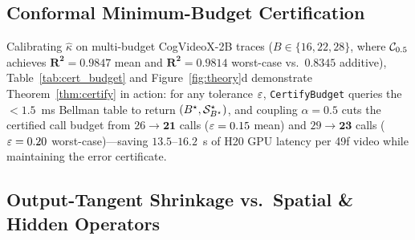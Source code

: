\subsection{Conformal Minimum-Budget Certification}
\label{sec:exp_certify}

\begin{table}[t]
\centering\footnotesize\setlength{\tabcolsep}{3.3pt}
\caption{\textbf{Risk-certified minimum-budget synthesis (\texttt{CertifyBudget}, Theorem~\ref{thm:certify})} on 50-step CogVideoX-2B. Midpoint shrinkage ($\alpha=0.5$) saves $5\text{--}6$ full 3D-DiT evaluations at the exact same certified mean or worst-case bound.}
\label{tab:cert_budget}
\end{table}

Calibrating $\hat{\kappa}$ on multi-budget CogVideoX-2B traces ($B \in \{16, 22, 28\}$, where $\mathcal{C}_{0.5}$ achieves $\mathbf{R^2 = 0.9847}$ mean and $\mathbf{R^2 = 0.9814}$ worst-case vs.\ $0.8345$ additive), Table~\ref{tab:cert_budget} and Figure~\ref{fig:theory}d demonstrate Theorem~\ref{thm:certify} in action: for any tolerance $\varepsilon$, \texttt{CertifyBudget} queries the $<1.5$~ms Bellman table to return $(B^\star, \mathcal{S}_{B^\star}^\star)$, and coupling $\alpha = 0.5$ cuts the certified call budget from $26 \to \mathbf{21}$ calls ($\varepsilon = 0.15$ mean) and $29 \to \mathbf{23}$ calls ($\varepsilon = 0.20$ worst-case)---saving $13.5\text{--}16.2$~s of H20 GPU latency per 49f video while maintaining the error certificate.

\subsection{Output-Tangent Shrinkage vs.\ Spatial \& Hidden Operators}
\label{sec:exp_shrinkage}

